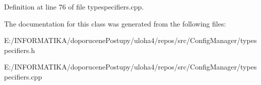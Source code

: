 Definition at line 76 of file typespecifiers.\+cpp.



The documentation for this class was generated from the following files\+:\begin{DoxyCompactItemize}
\item 
E\+:/\+I\+N\+F\+O\+R\+M\+A\+T\+I\+K\+A/doporucene\+Postupy/uloha4/repos/src/\+Config\+Manager/typespecifiers.\+h\item 
E\+:/\+I\+N\+F\+O\+R\+M\+A\+T\+I\+K\+A/doporucene\+Postupy/uloha4/repos/src/\+Config\+Manager/typespecifiers.\+cpp\end{DoxyCompactItemize}
